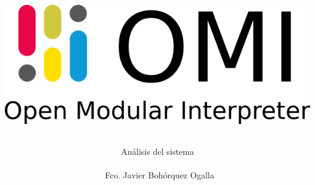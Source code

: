 \documentclass[12pt, spanish]{article}
\author{Análisis del sistema \\\\\ Fco. Javier Bohórquez Ogalla}						%
\date{}														%
\title{ 
\begin{center}
\includegraphics[scale=0.5]{logo-doc.png}
\end{center} 
}
\begin{document}
\maketitle
\pagebreak
\tableofcontents
\pagebreak




\end{document}

